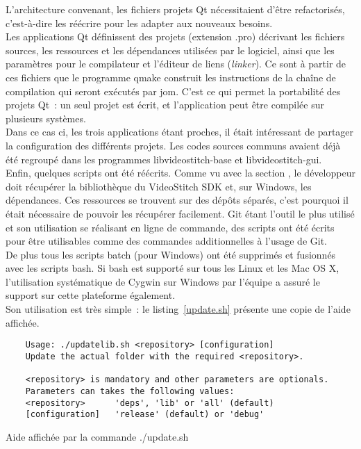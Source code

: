 \newline
L'architecture convenant, les fichiers projets Qt nécessitaient d'être refactorisés,
c'est-à-dire les réécrire pour les adapter aux nouveaux besoins.\\
Les applications Qt définissent des projets (extension .pro) décrivant
les fichiers sources, les ressources et les dépendances utilisées par le logiciel, ainsi que les
paramètres pour le compilateur et l'éditeur de liens (\textit{linker}). Ce sont à 
partir de ces fichiers que le programme qmake construit les instructions de la chaîne
de compilation qui seront exécutés par jom\cite{qt}. C'est ce qui permet la portabilité
des projets Qt~: un seul projet est écrit, et l'application peut être compilée sur
plusieurs systèmes.\\
Dans ce cas ci, les trois applications étant proches, il était intéressant de partager
la configuration des différents projets. Les codes sources communs avaient déjà été
regroupé dans les programmes libvideostitch-base et libvideostitch-gui.
\ \\
\newline
Enfin, quelques scripts ont été réécrits. Comme vu avec la section , le
développeur doit récupérer la bibliothèque du VideoStitch SDK et, sur Windows,
les dépendances. Ces ressources se trouvent sur des dépôts séparés, c'est pourquoi
il était nécessaire de pouvoir les récupérer facilement. Git étant l'outil le plus
utilisé et son utilisation se réalisant en ligne de commande,
des scripts ont été écrits pour être utilisables comme des commandes additionnelles à l'usage de Git.\\
De plus tous les scripts batch (pour Windows) ont été supprimés et fusionnés avec
les scripts bash. Si bash est supporté sur tous les Linux et les Mac OS X,
l'utilisation systématique de Cygwin sur Windows par l'équipe a assuré le support
sur cette plateforme également.\\
Son utilisation est très simple~: le listing~\ref{update.sh} présente une copie de l'aide affichée.
\begin{listing}
  \begin{verbatim}
    Usage: ./updatelib.sh <repository> [configuration]
    Update the actual folder with the required <repository>.

    <repository> is mandatory and other parameters are optionals.
    Parameters can takes the following values:
    <repository>      'deps', 'lib' or 'all' (default)
    [configuration]   'release' (default) or 'debug'
  \end{verbatim}
  \caption{Aide affichée par la commande ./update.sh}
  \label{update.sh}
\end{listing}
